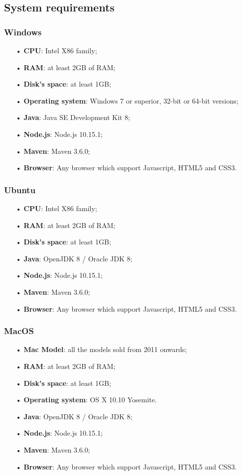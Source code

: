 \subsection{System requirements}
\subsubsection{Windows}
\begin{itemize}
\item [•]\textbf{CPU}: Intel X86 family;
\item [•]\textbf{RAM}: at least 2GB of RAM;
\item [•]\textbf{Disk's space}: at least 1GB;
\item [•]\textbf{Operating system}: Windows 7 or superior, 32-bit or 64-bit versions;
\item [•]\textbf{Java}: Java SE Development Kit 8;
\item [•]\textbf{Node.js}: Node.js 10.15.1;
\item [•]\textbf{Maven}: Maven 3.6.0;
\item [•]\textbf{Browser}: Any browser which support Javascript, HTML5 and CSS3.

\end{itemize}

\subsubsection{Ubuntu}
\begin{itemize}
\item [•]\textbf{CPU}: Intel X86 family;
\item [•]\textbf{RAM}: at least 2GB of RAM;
\item [•]\textbf{Disk's space}: at least 1GB;
\item [•]\textbf{Java}: OpenJDK 8 / Oracle JDK 8;
\item [•]\textbf{Node.js}: Node.js 10.15.1;
\item [•]\textbf{Maven}: Maven 3.6.0;
\item [•]\textbf{Browser}: Any browser which support Javascript, HTML5 and CSS3.
\end{itemize}

\subsubsection{MacOS}
\begin{itemize}
\item [•]\textbf{Mac Model}: all the models sold from 2011 onwards;
\item [•]\textbf{RAM}: at least 2GB of RAM;
\item [•]\textbf{Disk’s space}: at least 1GB;
\item [•]\textbf{Operating system}: OS X 10.10 Yosemite.
\item [•]\textbf{Java}: OpenJDK 8 / Oracle JDK 8;
\item [•]\textbf{Node.js}: Node.js 10.15.1;
\item [•]\textbf{Maven}: Maven 3.6.0;
\item [•]\textbf{Browser}: Any browser which support Javascript, HTML5 and CSS3.
\end{itemize}

